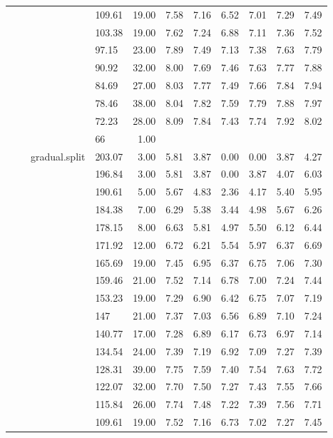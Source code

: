 \begin{longtable}{llllrrrrrrr}
   &  &  & 109.61 & 19.00 & 7.58 & 7.16 & 6.52 & 7.01 & 7.29 & 7.49 \\ 
   &  &  & 103.38 & 19.00 & 7.62 & 7.24 & 6.88 & 7.11 & 7.36 & 7.52 \\ 
   &  &  & 97.15 & 23.00 & 7.89 & 7.49 & 7.13 & 7.38 & 7.63 & 7.79 \\ 
   &  &  & 90.92 & 32.00 & 8.00 & 7.69 & 7.46 & 7.63 & 7.77 & 7.88 \\ 
   &  &  & 84.69 & 27.00 & 8.03 & 7.77 & 7.49 & 7.66 & 7.84 & 7.94 \\ 
   &  &  & 78.46 & 38.00 & 8.04 & 7.82 & 7.59 & 7.79 & 7.88 & 7.97 \\ 
   &  &  & 72.23 & 28.00 & 8.09 & 7.84 & 7.43 & 7.74 & 7.92 & 8.02 \\ 
   &  &  & 66 & 1.00 &  &  &  &  &  &  \\ 
   &  & gradual.split & 203.07 & 3.00 & 5.81 & 3.87 & 0.00 & 0.00 & 3.87 & 4.27 \\ 
   &  &  & 196.84 & 3.00 & 5.81 & 3.87 & 0.00 & 3.87 & 4.07 & 6.03 \\ 
   &  &  & 190.61 & 5.00 & 5.67 & 4.83 & 2.36 & 4.17 & 5.40 & 5.95 \\ 
   &  &  & 184.38 & 7.00 & 6.29 & 5.38 & 3.44 & 4.98 & 5.67 & 6.26 \\ 
   &  &  & 178.15 & 8.00 & 6.63 & 5.81 & 4.97 & 5.50 & 6.12 & 6.44 \\ 
   &  &  & 171.92 & 12.00 & 6.72 & 6.21 & 5.54 & 5.97 & 6.37 & 6.69 \\ 
   &  &  & 165.69 & 19.00 & 7.45 & 6.95 & 6.37 & 6.75 & 7.06 & 7.30 \\ 
   &  &  & 159.46 & 21.00 & 7.52 & 7.14 & 6.78 & 7.00 & 7.24 & 7.44 \\ 
   &  &  & 153.23 & 19.00 & 7.29 & 6.90 & 6.42 & 6.75 & 7.07 & 7.19 \\ 
   &  &  & 147 & 21.00 & 7.37 & 7.03 & 6.56 & 6.89 & 7.10 & 7.24 \\ 
   &  &  & 140.77 & 17.00 & 7.28 & 6.89 & 6.17 & 6.73 & 6.97 & 7.14 \\ 
   &  &  & 134.54 & 24.00 & 7.39 & 7.19 & 6.92 & 7.09 & 7.27 & 7.39 \\ 
   &  &  & 128.31 & 39.00 & 7.75 & 7.59 & 7.40 & 7.54 & 7.63 & 7.72 \\ 
   &  &  & 122.07 & 32.00 & 7.70 & 7.50 & 7.27 & 7.43 & 7.55 & 7.66 \\ 
   &  &  & 115.84 & 26.00 & 7.74 & 7.48 & 7.22 & 7.39 & 7.56 & 7.71 \\ 
   &  &  & 109.61 & 19.00 & 7.52 & 7.16 & 6.73 & 7.02 & 7.27 & 7.45 \\ 

\end{longtable}
